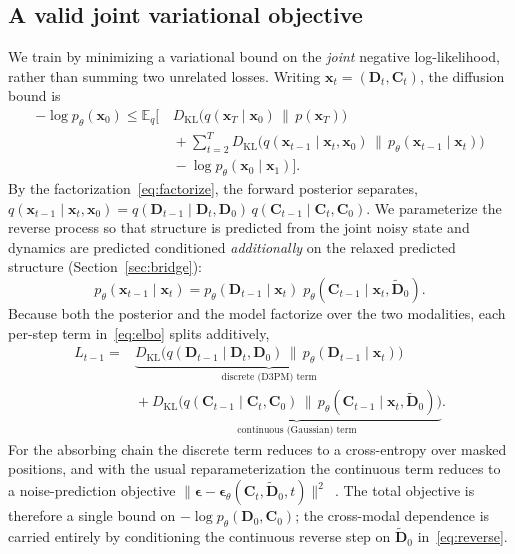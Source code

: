 \documentclass[review]{elsarticle}
\begin{document}
\subsection{A valid joint variational objective}
\label{sec:elbo}
We train by minimizing a variational bound on the \emph{joint} negative log-likelihood,
rather than summing two unrelated losses. Writing $\mathbf{x}_t=(\mathbf{D}_t,\mathbf{C}_t)$,
the diffusion bound is
\begin{equation}
\label{eq:elbo}
\begin{aligned}
-\log p_\theta(\mathbf{x}_0) \le \mathbb{E}_q\Big[\,
& D_{\mathrm{KL}}\!\big(q(\mathbf{x}_T\mid\mathbf{x}_0)\,\|\,p(\mathbf{x}_T)\big) \\
&{}+\sum_{t=2}^{T} D_{\mathrm{KL}}\!\big(q(\mathbf{x}_{t-1}\mid\mathbf{x}_t,\mathbf{x}_0)\,\|\,p_\theta(\mathbf{x}_{t-1}\mid\mathbf{x}_t)\big) \\
&{}-\log p_\theta(\mathbf{x}_0\mid\mathbf{x}_1)\Big].
\end{aligned}
\end{equation}
By the factorization~\eqref{eq:factorize}, the forward posterior separates,
$q(\mathbf{x}_{t-1}\mid\mathbf{x}_t,\mathbf{x}_0)
=q(\mathbf{D}_{t-1}\mid\mathbf{D}_t,\mathbf{D}_0)\,q(\mathbf{C}_{t-1}\mid\mathbf{C}_t,\mathbf{C}_0)$.
We parameterize the reverse process so that structure is predicted from the joint noisy
state and dynamics are predicted conditioned \emph{additionally} on the relaxed predicted
structure (Section~\ref{sec:bridge}):
\begin{equation}
p_\theta(\mathbf{x}_{t-1}\mid\mathbf{x}_t)=
p_\theta(\mathbf{D}_{t-1}\mid\mathbf{x}_t)\;
p_\theta(\mathbf{C}_{t-1}\mid\mathbf{x}_t,\tilde{\mathbf{D}}_0).
\label{eq:reverse}
\end{equation}
Because both the posterior and the model factorize over the two modalities, each per-step
term in~\eqref{eq:elbo} splits additively,
\begin{equation}
\begin{aligned}
L_{t-1} ={}& \underbrace{D_{\mathrm{KL}}\!\big(q(\mathbf{D}_{t-1}\mid\mathbf{D}_t,\mathbf{D}_0)\,\|\,p_\theta(\mathbf{D}_{t-1}\mid\mathbf{x}_t)\big)}_{\text{discrete (D3PM) term}} \\
&{}+\underbrace{D_{\mathrm{KL}}\!\big(q(\mathbf{C}_{t-1}\mid\mathbf{C}_t,\mathbf{C}_0)\,\|\,p_\theta(\mathbf{C}_{t-1}\mid\mathbf{x}_t,\tilde{\mathbf{D}}_0)\big)}_{\text{continuous (Gaussian) term}}.
\end{aligned}
\end{equation}
For the absorbing chain the discrete term reduces to a cross-entropy over masked positions,
and with the usual reparameterization the continuous term reduces to a noise-prediction
objective $\lVert\boldsymbol{\epsilon}-\boldsymbol{\epsilon}_\theta(\mathbf{C}_t,\tilde{\mathbf{D}}_0,t)\rVert^2$~\cite{ho2020ddpm}.
The total objective is therefore a single bound on
$-\log p_\theta(\mathbf{D}_0,\mathbf{C}_0)$; the cross-modal dependence is carried entirely
by conditioning the continuous reverse step on $\tilde{\mathbf{D}}_0$ in~\eqref{eq:reverse}.
\end{document}
